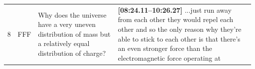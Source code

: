 \documentclass[10pt]{article}
\begin{document}
\begin{tiny}
\begin{longtable}{|r|p{0.375in}|p{1.275in}|p{3.5in}|}
8  &          FFF &                                                                                                                                                                     Why does the universe have a very uneven distribution of mass but a relatively equal distribution of charge? &                                                                                                                                                                                                                                                                                                                                                                                                                                                                                                                                                                                                                                                                                                                                                                                                                                                                                                                                                                                                                                                                                                                                                                                                                                                                                                                                                                                                                                                                                                                                                                                                                                                                                                                                                                                                                                                                                                                                                                                                                                                                                                                                                                                                                                                                                                                                                                                                                                                                                                                                                                                                                                                                                                                                                                                                                                             \textbf{[08:24.11--10:26.27]} ...just run away from each other they would repel each other and so the only reason why they're able to stick to each other is that there's an even stronger force than the electromagnetic force operating at 
\end{longtable}
\end{tiny}
\end{document}
